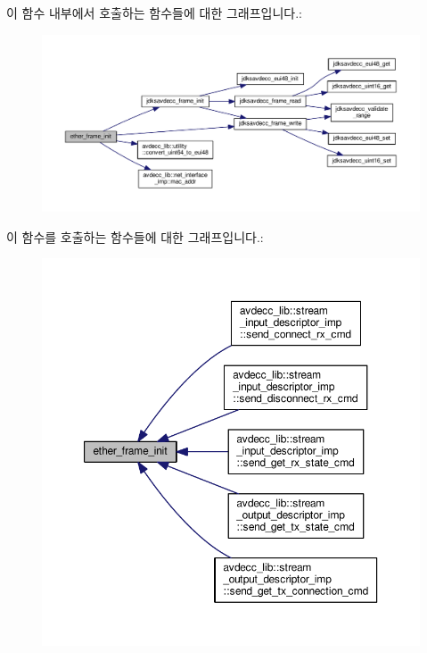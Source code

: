 이 함수 내부에서 호출하는 함수들에 대한 그래프입니다.\+:
\nopagebreak
\begin{figure}[H]
\begin{center}
\leavevmode
\includegraphics[width=350pt]{classavdecc__lib_1_1acmp__controller__state__machine_a0a43868a3e99a6cef740e4562d006345_cgraph}
\end{center}
\end{figure}




이 함수를 호출하는 함수들에 대한 그래프입니다.\+:
\nopagebreak
\begin{figure}[H]
\begin{center}
\leavevmode
\includegraphics[width=350pt]{classavdecc__lib_1_1acmp__controller__state__machine_a0a43868a3e99a6cef740e4562d006345_icgraph}
\end{center}
\end{figure}


